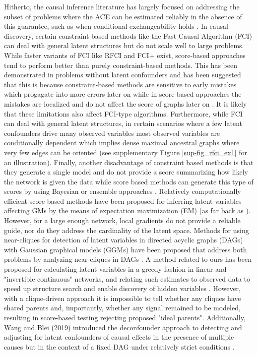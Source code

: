 \documentclass{article}
\begin{document}
Hitherto, the causal inference literature has largely focused on addressing the subset of problems where the ACE can be estimated reliably in the absence of this guarantee, such as when conditional exchangeability holds \cite{hernan_estimating_2006}.  In causal discovery, certain constraint-based methods like the Fast
Causal Algorithm (FCI) \cite{spirtesCausalInferencePresence1995} can
deal with general latent structures but do not scale well to large
problems. While faster variants of FCI like RFCI \cite{colombo_learning_2012}
and  FCI+ \cite{claassenLearningSparseCausal2013} exist, score-based
approaches tend to perform better than purely constraint-based methods. This
has been demonstrated in problems without latent confounders
\cite{nandy2018high} and has been suggested that this is because
constraint-based methods are sensitive to early mistakes which
progagate into more errors later on while in score-based approaches
the mistakes are localized and do not affect the score of graphs later
on \cite{bernstein2020ordering}. It is likely that these limitations also
affect FCI-type algorithms. Furthermore, while FCI can deal with
general latent structures, in certain scenarios where a few latent confounders
drive  many observed variables  most observed variables are
conditionally dependent which implies dense maximal ancestral graphs
where very few edges can be oriented
\cite{frotRobustCausalStructure2017} (see supplementary Figure \ref{sup-fig_rfci_ex1} for
an illustration). Finally, another disadvantage of
constraint based methods is that they generate a single model and do
not provide a score summarizing how likely the network is given the
data while score based methods can generate this type of scores by using Bayesian or ensemble approaches \cite{jabbariDiscoveryCausalModels2017}. Relatively computationally efficient score-based methods have been proposed for inferring latent variables affecting GMs by the means of expectation maximization (EM) (as far back as \cite{friedman1997learning,friedman1998bayesian}).  However, for a large enough network, local gradients do not provide a reliable guide, nor do they address the cardinality of the latent space.  Methods for using near-cliques for detection of latent variables in directed acyclic graphs (DAGs) with Gaussian graphical models (GGMs) have been proposed that address both problems by analyzing near-cliques in DAGs \cite{elidan_discovering_2001,silva_learning_2006}.  A method related to ours has been proposed for calculating latent variables in a greedy fashion in linear and "invertible continuous" networks, and relating such estimates to observed data to speed up structure search and enable discovery of hidden variables \cite{elidan_ideal_2007}. However, with a clique-driven approach it is impossible to tell whether any cliques have shared parents and, importantly, whether any signal remained to be modeled, resulting in score-based testing rejecting proposed "ideal parents". Additionally, Wang and Blei (2019) introduced the deconfounder approach to detecting and adjusting for latent confounders of causal effects in the presence of multiple causes but in the context of a fixed DAG under relatively strict conditions \cite{wang_deconfounder_2019,wangMultipleCausesCausal2019}. 
\end{document}

